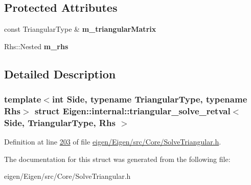 \subsection*{Protected Attributes}
\begin{DoxyCompactItemize}
\item 
\mbox{\label{struct_eigen_1_1internal_1_1triangular__solve__retval_ad9b54440fc593923252d5b94809c3e4e}} 
const Triangular\+Type \& {\bfseries m\+\_\+triangular\+Matrix}
\item 
\mbox{\label{struct_eigen_1_1internal_1_1triangular__solve__retval_ae537f77975204e1c1940c5162db71537}} 
Rhs\+::\+Nested {\bfseries m\+\_\+rhs}
\end{DoxyCompactItemize}


\subsection{Detailed Description}
\subsubsection*{template$<$int Side, typename Triangular\+Type, typename Rhs$>$\newline
struct Eigen\+::internal\+::triangular\+\_\+solve\+\_\+retval$<$ Side, Triangular\+Type, Rhs $>$}



Definition at line \hyperlink{eigen_2_eigen_2src_2_core_2_solve_triangular_8h_source_l00203}{203} of file \hyperlink{eigen_2_eigen_2src_2_core_2_solve_triangular_8h_source}{eigen/\+Eigen/src/\+Core/\+Solve\+Triangular.\+h}.



The documentation for this struct was generated from the following file\+:\begin{DoxyCompactItemize}
\item 
eigen/\+Eigen/src/\+Core/\+Solve\+Triangular.\+h\end{DoxyCompactItemize}
